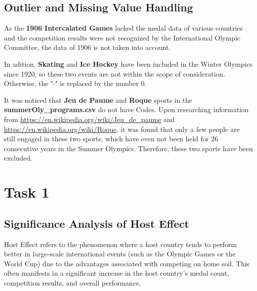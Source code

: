 \documentclass{mcmthesis}
\begin{document}
	\subsection{Outlier and Missing Value Handling}
	As the \textbf{1906 Intercalated Games} lacked the medal data of various countries and the competition results were not recognized by the International Olympic Committee, the data of 1906 is not taken into account.
	
	In adition, \textbf{Skating} and \textbf{Ice Hockey} have been included in the Winter Olympics since 1920, so these two events are not within the scope of consideration. Otherwise, the "$\cdot$" is replaced by the number $0$. 
	
	It was noticed that \textbf{Jeu de Paume} and \textbf{Roque} sports in the {\bf summerOly\_programs.csv} do not have Codes. Upon researching information from {\color{blue}\url{https://en.wikipedia.org/wiki/Jeu_de_paume}} and {\color{blue}\url{https://en.wikipedia.org/wiki/Roque}}, it was found that only a few people are still engaged in these two sports, which have even not been held for 26 consecutive years in the Summer Olympics. Therefore, these two sports have been excluded.
	
	
	
	
	
	
	
	
	
	
	
	
	
	
	
	
	\section{Task 1}
	
	\subsection{Significance Analysis of Host Effect}
	
	Host Effect refers to the phenomenon where a host country tends to perform better in large-scale international events (such as the Olympic Games or the World Cup) due to the advantages associated with competing on home soil. This often manifests in a significant increase in the host country's medal count, competition results, and overall performance.
	
\end{document}
